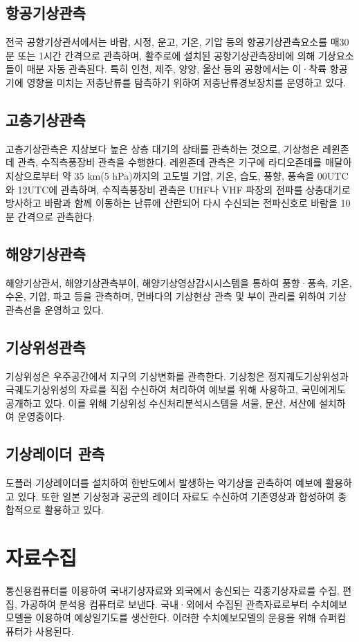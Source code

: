 \subsection{항공기상관측}
전국 공항기상관서에서는 바람, 시정, 운고, 기온, 기압 등의 항공기상관측요소를 매30분 또는 1시간 간격으로 관측하며, 활주로에 설치된 공항기상관측장비에 의해 기상요소들이 매분 자동 관측된다. 특히 인천, 제주, 양양, 울산 등의 공항에서는 이·착륙 항공기에 영향을 미치는 저층난류를 탐측하기 위하여 저층난류경보장치를 운영하고 있다.

\subsection{고층기상관측}
고층기상관측은 지상보다 높은 상층 대기의 상태를 관측하는 것으로, 기상청은 레윈존데 관측, 수직측풍장비 관측을 수행한다. 레윈존데 관측은 기구에 라디오존데를 매달아 지상으로부터 약 35 km(5 hPa)까지의 고도별 기압, 기온, 습도, 풍향, 풍속을 00UTC와 12UTC에 관측하며, 수직측풍장비 관측은 UHF나 VHF 파장의 전파를 상층대기로 방사하고 바람과 함께 이동하는 난류에 산란되어 다시 수신되는 전파신호로 바람을 10분 간격으로 관측한다.

\subsection{해양기상관측}
해양기상관서, 해양기상관측부이, 해양기상영상감시시스템을 통하여 풍향·풍속, 기온, 수온, 기압, 파고 등을 관측하며, 먼바다의 기상현상 관측 및 부이 관리를 위하여 기상관측선을 운영하고 있다.

\subsection{기상위성관측}
기상위성은 우주공간에서 지구의 기상변화를 관측한다. 기상청은 정지궤도기상위성과 극궤도기상위성의 자료를 직접 수신하여 처리하여 예보를 위해 사용하고, 국민에게도 공개하고 있다. 이를 위해 기상위성 수신처리분석시스템을 서울, 문산, 서산에 설치하여 운영중이다.

\subsection{기상레이더 관측}
도플러 기상레이더를 설치하여 한반도에서 발생하는 악기상을 관측하여 예보에 활용하고 있다. 또한 일본 기상청과 공군의 레이더 자료도 수신하여 기존영상과 합성하여 종합적으로 활용하고 있다.


\section{자료수집}
통신용컴퓨터를 이용하여 국내기상자료와 외국에서 송신되는 각종기상자료를 수집, 편집, 가공하여 분석용 컴퓨터로 보낸다. 국내·외에서 수집된 관측자료로부터 수치예보모델을 이용하여 예상일기도를 생산한다. 이러한 수치예보모델의 운용을 위해 슈퍼컴퓨터가 사용된다.


